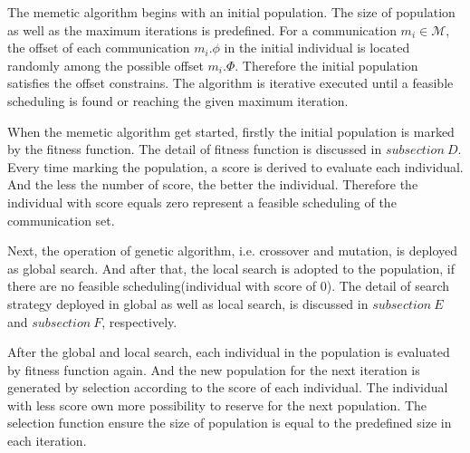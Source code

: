 \documentclass[journal]{IEEEtran}
\begin{document}
The memetic algorithm begins with an initial population. The size of population as well as the maximum iterations is predefined. For a communication $m_{i}\in\mathcal{M}$, the offset of each communication $m_{i}.\phi$ in the initial individual is located randomly among the possible offset $m_{i}.\Phi$. Therefore the initial population satisfies the offset constrains. The algorithm is iterative executed until a feasible scheduling is found or reaching the given maximum iteration.

When the memetic algorithm get started, firstly the initial population is marked by the fitness function. The detail of fitness function is discussed in $subsection\ D$. Every time marking the population, a score is derived to evaluate each individual. And the less the number of score, the better the individual. Therefore the individual with score equals zero represent a feasible scheduling of the communication set.

Next, the operation of genetic algorithm, i.e. crossover and mutation, is deployed as global search. And after that, the local search is adopted to the population, if there are no feasible scheduling(individual with score of 0). The detail of search strategy deployed in global as well as local search, is discussed in $subsection\ E$ and $subsection\ F$, respectively.

After the global and local search, each individual in the population is evaluated by fitness function again. And the new population for the next iteration is generated by selection according to the score of each individual. The individual with less score own more possibility to reserve for the next population. The selection function ensure the size of population is equal to the predefined size in each iteration.
\end{document}
